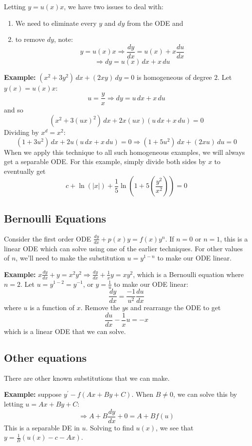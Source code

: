 \documentclass[11pt]{article}
\newcommand{\example}{\textbf{Example: }}
\newcommand{\fdx}{\frac{dy}{dx}} %
\newcommand{\yp}{y^{\prime}}
\newcommand{\dx}{\,dx} %
\newcommand{\dy}{\,dy} %
\begin{document}
	Letting $y = u(x) x$, we have two issues to deal with:
		\begin{enumerate}
			\item We need to eliminate every $y$ and $dy$ from the ODE and
			\item to remove $dy$, note:
				$$ y = u(x) x \Rightarrow \fdx = u(x) + x \frac{du}{dx} $$
				$$ \Rightarrow dy = u(x)\dx + x \,du $$
		\end{enumerate}

	\example $(x^2 + 3y^2)\dx + (2xy)\dy = 0$ is homogeneous of degree $2$. Let $y(x)=u(x)x$:
		$$ u = \frac{y}{x} \Rightarrow dy = u\dx + x\,du $$
	and so
		$$ (x^2 + 3 (ux)^2)\dx + 2x (ux) (u\dx + x\,du) = 0 $$
	Dividing by $x^d = x^2$:
		$$ (1 + 3u^2)\dx + 2u (u\dx + x\,du) = 0 \Rightarrow (1 + 5u^2)\dx + (2xu)\,du = 0 $$
	When we apply this technique to all such homogeneous examples, we will always get a separable ODE. For this example, simply divide both sides by $x$ to eventually get
		$$ c + \ln(|x|) + \frac{1}{5} \ln \left(1 + 5 \left(\frac{y^2}{x^2}\right)\right) = 0 $$

\subsection{Bernoulli Equations}
	Consider the first order ODE $\fdx + p(x)y = f(x) y^n$. If $n=0$ or $n=1$, this is a linear ODE which can solve using one of the earlier techniques. For other values of $n$, we'll need to make the substitution $u = y^{1-n}$ to make our ODE linear.

	\example $x \fdx + y = x^2 y^2 \Rightarrow \fdx + \frac{1}{x} y = x y^2$, which is a Bernoulli equation where $n=2$. Let $u = y^{1-2} = y^{-1}$, or $y = \frac{1}{u}$ to make our ODE linear:
		$$ \fdx = \frac{-1}{u^2} \frac{du}{dx} $$
	where $u$ is a function of $x$. Remove the $y$s and rearrange the ODE to get
		$$ \frac{du}{dx} - \frac{1}{x} u = -x $$
	which is a linear ODE that we can solve.

\subsection{Other equations}
	There are other known substitutions that we can make.

	\example suppose $\yp - f(Ax + By + C)$. When $B \neq 0$, we can solve this by letting $u = Ax + By + C$:
		$$ \Rightarrow A + B \fdx + 0 = A + B f(u) $$
	This is a separable DE in $u$. Solving to find $u(x)$, we see that $y = \frac{1}{B} (u(x) - c - Ax)$.
\end{document}
